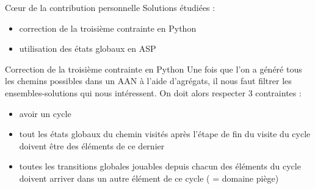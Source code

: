 \documentclass{beamer}
\begin{document}
\begin{frame}{Cœur de la contribution personnelle}
	\pause
	Solutions étudiées : 
	\begin{itemize}
		\pause
		\item correction de la troisième contrainte en Python
		\pause
		\item utilisation des états globaux en ASP
	\end{itemize}
\end{frame}

\begin{frame}{Correction de la troisième contrainte en Python}
	\pause
	Une fois que l'on a généré tous les chemins possibles dans un AAN à l'aide d'agrégats, il nous faut filtrer les ensembles-solutions qui nous intéressent. On doit alors respecter 3 contraintes : \\
	\begin{itemize}
		\pause
		\item avoir un cycle
		\pause
		\item tout les états globaux du chemin visités après l'étape de fin du visite du cycle doivent être des éléments de ce dernier
		\pause
		\item toutes les transitions globales jouables depuis chacun des éléments du cycle doivent arriver dans un autre élément de ce cycle ( = domaine piège)\\
	\end{itemize}
\end{frame}
\end{document}
